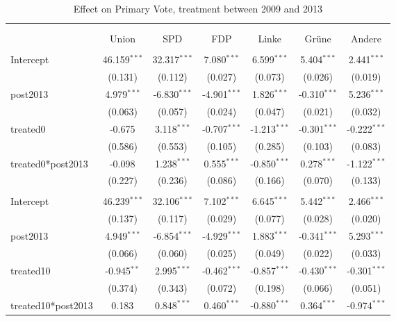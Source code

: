 \documentclass[12pt]{article}
\begin{document}
 
\begin{table}[!htbp] \centering
  \caption{Effect on Primary Vote, treatment between 2009 and 2013}
\begin{tabular}{@{\extracolsep{5pt}}lcccccc}
\\[-1.8ex]\hline
\hline \\[-1.8ex]
\\[-1.8ex] & \multicolumn{1}{c}{Union} & \multicolumn{1}{c}{SPD} & \multicolumn{1}{c}{FDP} & \multicolumn{1}{c}{Linke} & \multicolumn{1}{c}{Grüne} & \multicolumn{1}{c}{Andere}  \\
\hline \\[-1.8ex]
 Intercept & 46.159$^{***}$ & 32.317$^{***}$ & 7.080$^{***}$ & 6.599$^{***}$ & 5.404$^{***}$ & 2.441$^{***}$ \\
  & (0.131) & (0.112) & (0.027) & (0.073) & (0.026) & (0.019) \\
 post2013 & 4.979$^{***}$ & -6.830$^{***}$ & -4.901$^{***}$ & 1.826$^{***}$ & -0.310$^{***}$ & 5.236$^{***}$ \\
  & (0.063) & (0.057) & (0.024) & (0.047) & (0.021) & (0.032) \\
 treated0 & -0.675$^{}$ & 3.118$^{***}$ & -0.707$^{***}$ & -1.213$^{***}$ & -0.301$^{***}$ & -0.222$^{***}$ \\
  & (0.586) & (0.553) & (0.105) & (0.285) & (0.103) & (0.083) \\
 treated0*post2013 & -0.098$^{}$ & 1.238$^{***}$ & 0.555$^{***}$ & -0.850$^{***}$ & 0.278$^{***}$ & -1.122$^{***}$ \\
  & (0.227) & (0.236) & (0.086) & (0.166) & (0.070) & (0.133) \\
\hline \\[-1.8ex]
 Intercept & 46.239$^{***}$ & 32.106$^{***}$ & 7.102$^{***}$ & 6.645$^{***}$ & 5.442$^{***}$ & 2.466$^{***}$ \\
  & (0.137) & (0.117) & (0.029) & (0.077) & (0.028) & (0.020) \\
 post2013 & 4.949$^{***}$ & -6.854$^{***}$ & -4.929$^{***}$ & 1.883$^{***}$ & -0.341$^{***}$ & 5.293$^{***}$ \\
  & (0.066) & (0.060) & (0.025) & (0.049) & (0.022) & (0.033) \\
 treated10 & -0.945$^{**}$ & 2.995$^{***}$ & -0.462$^{***}$ & -0.857$^{***}$ & -0.430$^{***}$ & -0.301$^{***}$ \\
  & (0.374) & (0.343) & (0.072) & (0.198) & (0.066) & (0.051) \\
 treated10*post2013 & 0.183$^{}$ & 0.848$^{***}$ & 0.460$^{***}$ & -0.880$^{***}$ & 0.364$^{***}$ & -0.974$^{***}$ \\

\end{tabular}
\end{table}
\end{document}
